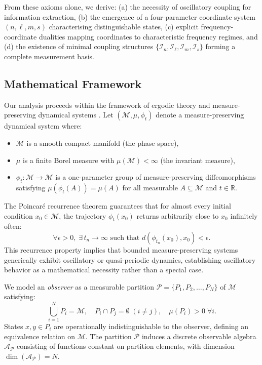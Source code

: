 \documentclass[twocolumn,10pt,a4paper]{article}
\theoremstyle{remark}
\newcommand{\manifold}{\mathcal{M}}
\newcommand{\partition}{\mathcal{P}}
\begin{document}
From these axioms alone, we derive: (a) the necessity of oscillatory coupling for information extraction, (b) the emergence of a four-parameter coordinate system $(n,\ell,m,s)$ characterising distinguishable states, (c) explicit frequency-coordinate dualities mapping coordinates to characteristic frequency regimes, and (d) the existence of minimal coupling structures $\{\mathcal{I}_n, \mathcal{I}_\ell, \mathcal{I}_m, \mathcal{I}_s\}$ forming a complete measurement basis.

\subsection{Mathematical Framework}

Our analysis proceeds within the framework of ergodic theory and measure-preserving dynamical systems \citep{Poincare1890, Birkhoff1931, Kolmogorov1954}. Let $(\manifold, \mu, \phi_t)$ denote a measure-preserving dynamical system where:
\begin{itemize}
    \item $\manifold$ is a smooth compact manifold (the phase space),
    \item $\mu$ is a finite Borel measure with $\mu(\manifold) < \infty$ (the invariant measure),
    \item $\phi_t: \manifold \to \manifold$ is a one-parameter group of measure-preserving diffeomorphisms satisfying $\mu(\phi_t(A)) = \mu(A)$ for all measurable $A \subseteq \manifold$ and $t \in \mathbb{R}$.
\end{itemize}

The Poincaré recurrence theorem \citep{Poincare1890} guarantees that for almost every initial condition $x_0 \in \manifold$, the trajectory $\phi_t(x_0)$ returns arbitrarily close to $x_0$ infinitely often:
\begin{equation}
\forall \epsilon > 0, \; \exists \, t_n \to \infty \text{ such that } d(\phi_{t_n}(x_0), x_0) < \epsilon.
\end{equation}
This recurrence property implies that bounded measure-preserving systems generically exhibit oscillatory or quasi-periodic dynamics, establishing oscillatory behavior as a mathematical necessity rather than a special case.

We model an \emph{observer} as a measurable partition $\partition = \{P_1, P_2, \ldots, P_N\}$ of $\manifold$ satisfying:
\begin{equation}
\bigcup_{i=1}^N P_i = \manifold, \quad P_i \cap P_j = \emptyset \; (i \neq j), \quad \mu(P_i) > 0 \; \forall i.
\end{equation}
States $x, y \in P_i$ are operationally indistinguishable to the observer, defining an equivalence relation on $\manifold$. The partition $\partition$ induces a discrete observable algebra $\mathcal{A}_\partition$ consisting of functions constant on partition elements, with dimension $\dim(\mathcal{A}_\partition) = N$.
\end{document}
